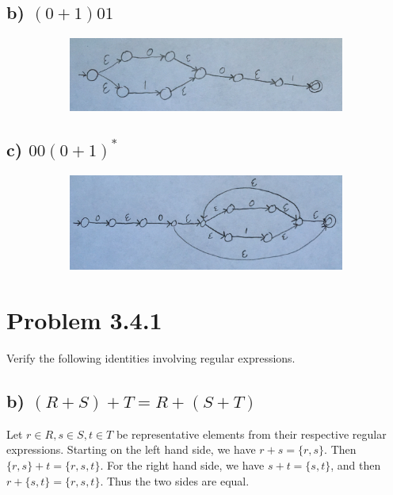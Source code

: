 \documentclass[20pt]{article} %
\begin{document}
\subsection{b) $(0+1)01$}
\begin{figure}[!htbp]
  	\centering
   	\begin{subfigure}[p]{0.8\linewidth}
    	\includegraphics[width=\linewidth]{./figures/h4-2.jpg}
   	\end{subfigure}
\end{figure}
\subsection{c) $00(0+1)^{*}$}
\begin{figure}[!htbp]
  	\centering
   	\begin{subfigure}[p]{0.8\linewidth}
    	\includegraphics[width=\linewidth]{./figures/h4-3.jpg}
   	\end{subfigure}
\end{figure}

\newpage
\section{Problem 3.4.1}
Verify the following identities involving regular expressions.
\subsection{b) $(R+S)+T=R+(S+T)$}

Let $r \in R, s \in S, t \in T$ be representative elements from their respective regular expressions. Starting on the left hand side, we have $r+s = \{r,s\}$. Then $\{r,s\}+t = \{r,s,t\}$. For the right hand side, we have $s+t = \{s,t\}$, and then $r+\{s,t\}=\{r,s,t\}$. Thus the two sides are equal.
\end{document}
